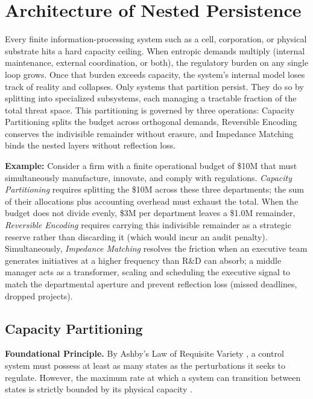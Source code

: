 \section{Architecture of Nested Persistence}
\label{sec:nested_persistence}

Every finite information-processing system such as a cell, corporation, or physical substrate hits a hard capacity ceiling. When entropic demands multiply (internal maintenance, external coordination, or both), the regulatory burden on any single loop grows. Once that burden exceeds capacity, the system's internal model loses track of reality and collapses. Only systems that partition persist. They do so by splitting into specialized subsystems, each managing a tractable fraction of the total threat space. This partitioning is governed by three operations: Capacity Partitioning splits the budget across orthogonal demands, Reversible Encoding conserves the indivisible remainder without erasure, and Impedance Matching binds the nested layers without reflection loss.

\textbf{Example:} Consider a firm with a finite operational budget of \$10M that must simultaneously manufacture, innovate, and comply with regulations. \textit{Capacity Partitioning} requires splitting the \$10M across these three departments; the sum of their allocations plus accounting overhead must exhaust the total. When the budget does not divide evenly, \$3M per department leaves a \$1.0M remainder, \textit{Reversible Encoding} requires carrying this indivisible remainder as a strategic reserve rather than discarding it (which would incur an audit penalty). Simultaneously, \textit{Impedance Matching} resolves the friction when an executive team generates initiatives at a higher frequency than R\&D can absorb; a middle manager acts as a transformer, scaling and scheduling the executive signal to match the departmental aperture and prevent reflection loss (missed deadlines, dropped projects).

\subsection{Capacity Partitioning}
\label{rule_capacity_partitioning}

\textbf{Foundational Principle.} By Ashby's Law of Requisite Variety \cite{raadt_ashbys_1987}, a control system must possess at least as many states as the perturbations it seeks to regulate. However, the maximum rate at which a system can transition between states is strictly bounded by its physical capacity \cite{margolus_maximum_1998}.

